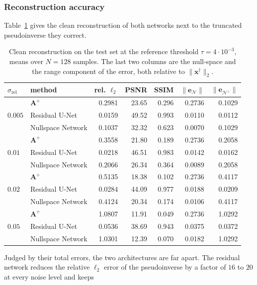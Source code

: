 \documentclass{article}
\numberwithin{equation}{section}
\begin{document}
\subsubsection{Reconstruction accuracy}
Table~\ref{tab:clean} gives the clean reconstruction of both networks next to the truncated
pseudoinverse they correct.
\begin{table}[htbp]
\centering
\caption{Clean reconstruction on the test set at the reference threshold $\tau=4\cdot10^{-3}$, means over
$N=128$ samples. The last two columns are the null-space and the range component of the error, both
relative to $\lVert\mathbf{x}^\dagger\rVert_2$.}\label{tab:clean}
\begin{tabular}{l l r r r r r}
\toprule
$\sigma_{\text{rel}}$ & method & rel. $\ell_2$ & PSNR & SSIM &
$\lVert\mathbf{e}_{\mathcal{N}}\rVert$ & $\lVert\mathbf{e}_{\mathcal{N}^\perp}\rVert$ \\
\midrule
\multirow{3}{*}{$0.005$} & $\mathbf{A}^{+}$ & 0.2981 & 23.65 & 0.296 & 0.2736 & 0.1029 \\
 & Residual U-Net & 0.0159 & 49.52 & 0.993 & 0.0110 & 0.0112 \\
 & Nullspace Network & 0.1037 & 32.32 & 0.623 & 0.0070 & 0.1029 \\
\midrule
\multirow{3}{*}{$0.01$} & $\mathbf{A}^{+}$ & 0.3558 & 21.80 & 0.189 & 0.2736 & 0.2058 \\
 & Residual U-Net & 0.0218 & 46.51 & 0.983 & 0.0142 & 0.0162 \\
 & Nullspace Network & 0.2066 & 26.34 & 0.364 & 0.0089 & 0.2058 \\
\midrule
\multirow{3}{*}{$0.02$} & $\mathbf{A}^{+}$ & 0.5135 & 18.38 & 0.102 & 0.2736 & 0.4117 \\
 & Residual U-Net & 0.0284 & 44.09 & 0.977 & 0.0188 & 0.0209 \\
 & Nullspace Network & 0.4124 & 20.34 & 0.174 & 0.0106 & 0.4117 \\
\midrule
\multirow{3}{*}{$0.05$} & $\mathbf{A}^{+}$ & 1.0807 & 11.91 & 0.049 & 0.2736 & 1.0292 \\
 & Residual U-Net & 0.0536 & 38.69 & 0.943 & 0.0375 & 0.0372 \\
 & Nullspace Network & 1.0301 & 12.39 & 0.070 & 0.0182 & 1.0292 \\
\bottomrule
\end{tabular}
\end{table}
Judged by their total errors, the two architectures are far apart. The residual network reduces the
relative $\ell_2$ error of the pseudoinverse by a factor of $16$ to $20$ at every noise level and keeps
\end{document}
